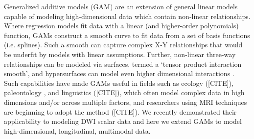 \documentclass[12pt]{article}
\begin{document}

Generalized additive models (GAM) are an extension of general linear models capable of modeling high-dimensional data which contain non-linear relationships. Where regression models fit data with a linear (and higher-order polynomials) function, GAMs construct a smooth curve to fit data from a set of basis functions (i.e. splines). Such a smooth can capture complex X-Y relationships that would be underfit by models with linear assumptions. Further, non-linear three-way relationships can be modeled via surfaces, termed a `tensor product interaction smooth', and hypersurfaces can model even higher dimensional interactions \parencite{baayen2020IntroductionGeneralizedAdditive}. Such capabilities have made GAMs useful in fields such as ecology ([CITE]), paleontology \parencite{simpson2018ModellingPalaeoecologicalTime}, and linguistics ([CITE]), which often model complex data in high dimensions and/or across multiple factors, and researchers using MRI techniques are beginning to adopt the method ([CITE]). We recently demonstrated their applicability to modeling DWI scalar data \parencite{muncy2022GeneralAdditiveModels} and here we extend GAMs to model high-dimensional, longitudinal, multimodal data.
\end{document}
